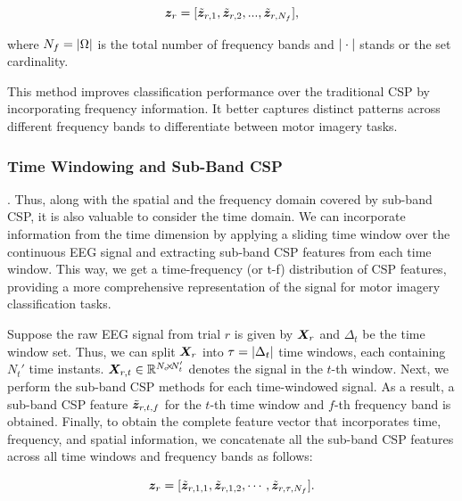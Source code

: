 \begin{equation}
\bm {z}_r = [\tilde{\bm {z}}_{r,1}, \tilde{\bm {z}}_{r,2}, ..., \tilde{\bm {z}}_{r,N_f}]   ,
\end{equation}

where $N_f = | \Omega |$ is the total number of frequency bands and $| \cdot |$ stands or the set cardinality.

This method improves classification performance over the traditional CSP by incorporating frequency information. It better captures distinct patterns across different frequency bands to differentiate between motor imagery tasks.

\subsubsection{Time Windowing and Sub-Band CSP}

. Thus, along with the spatial and the frequency domain covered by sub-band CSP, it is also valuable to consider the time domain. We can incorporate information from the time dimension by applying a sliding time window over the continuous EEG signal and extracting sub-band CSP features from each time window. This way, we get a time-frequency (or t-f) distribution of CSP features, providing a more comprehensive representation of the signal for motor imagery classification tasks.

Suppose the raw EEG signal from trial $r$ is given by $\bm {X}_r$ and $\Delta_t$ be the time window set. Thus, we can split $\bm {X}_r$ into $\tau = | \Delta_t |$ time windows, each containing $N_{t}'$ time instants. $\bm {X}_{r,t} \in \mathbb{R}^{N_c \negthickspace\times\negthickspace N_{t}'}$ denotes the signal in the $t$-th window. Next, we perform the sub-band CSP methods for each time-windowed signal. As a result, a sub-band CSP feature $\tilde{\bm {z}}_{r,t,f}$ for the $t$-th time window and $f$-th frequency band is obtained. Finally, to obtain the complete feature vector that incorporates time, frequency, and spatial information, we concatenate all the sub-band CSP features across all time windows and frequency bands as follows:

\begin{equation}
\bm {z}_r = [\tilde{\bm {z}}_{r,1,1}, \tilde{\bm {z}}_{r,1,2}, \cdots, \tilde{\bm {z}}_{r,\tau,N_f}]  .  
\end{equation}

